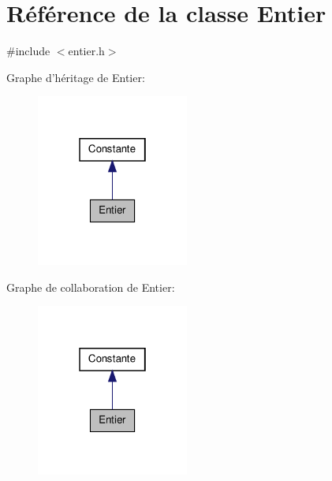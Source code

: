 \hypertarget{class_entier}{\section{\-Référence de la classe \-Entier}
\label{class_entier}
}


{\ttfamily \#include $<$entier.\-h$>$}



\-Graphe d'héritage de \-Entier\-:\nopagebreak
\begin{figure}[H]
\begin{center}
\leavevmode
\includegraphics[width=142pt]{class_entier__inherit__graph}
\end{center}
\end{figure}


\-Graphe de collaboration de \-Entier\-:\nopagebreak
\begin{figure}[H]
\begin{center}
\leavevmode
\includegraphics[width=142pt]{class_entier__coll__graph}
\end{center}
\end{figure}
